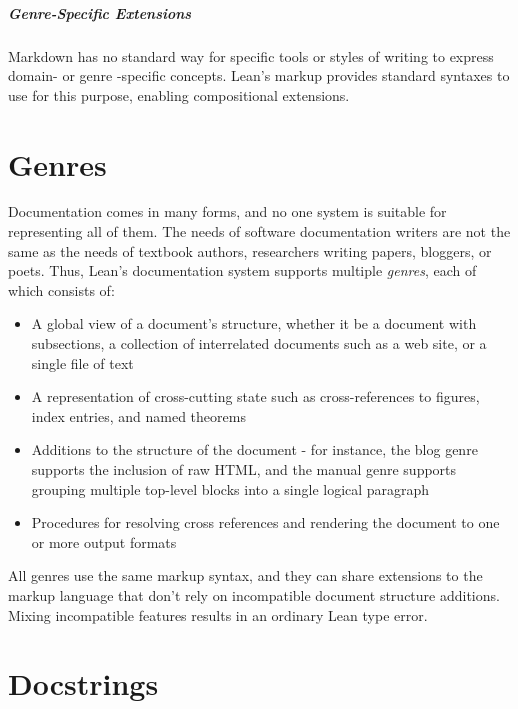 \documentclass{memoir}
\begin{document}
\paragraph{Genre-Specific Extensions}

Markdown has no standard way for specific tools or styles of writing to express domain- or genre
-specific concepts.
Lean's markup provides standard syntaxes to use for this purpose, enabling compositional extensions.





\chapter{Genres}

Documentation comes in many forms, and no one system is suitable for representing all of them.
The needs of software documentation writers are not the same as the needs of textbook authors, researchers writing papers, bloggers, or poets.
Thus, Lean's documentation system supports multiple \emph{genres}, each of which consists of:
\begin{itemize}
\item A global view of a document's structure, whether it be a document with subsections, a collection of interrelated documents such as a web site, or a single file of text\item A representation of cross-cutting state such as cross-references to figures, index entries, and named theorems\item Additions to the structure of the document - for instance, the blog genre supports the inclusion of raw HTML, and the manual genre supports grouping multiple top-level blocks into a single logical paragraph\item Procedures for resolving cross references and rendering the document to one or more output formats
\end{itemize}

All genres use the same markup syntax, and they can share extensions to the markup language that don't rely on incompatible document structure additions.
Mixing incompatible features results in an ordinary Lean type error.





\chapter{Docstrings}
\end{document}
